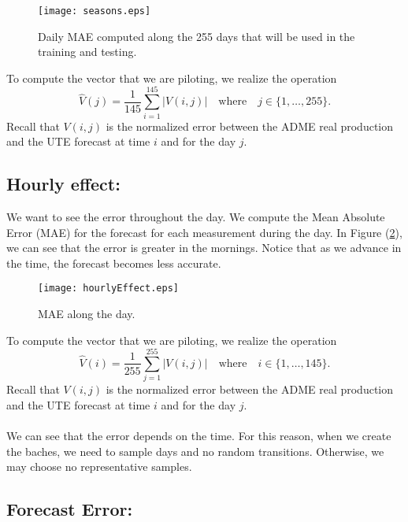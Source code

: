 \documentclass[12pt]{article}
\theoremstyle{definition}
\theoremstyle{remark}
\begin{document}
\begin{figure}[ht!]
\centering
{\texttt{[image: seasons.eps]}}
\caption{Daily MAE computed along the 255 days that will be used in the training and testing.}\label{plot1}
\end{figure}
To compute the vector that we are piloting, we realize the operation
\begin{equation*}
\hat{V}(j) =\frac{1}{145} \sum_{i=1}^{145}|V(i,j)|\quad\text{where}\quad j\in\{1,\dots,255\}.
\end{equation*}
Recall that $V(i,j)$ is the normalized error between the ADME real production and the UTE forecast at time $i$ and for the day $j$.


\pagebreak 

\subsection*{Hourly effect:}

We want to see the error throughout the day. We compute the Mean Absolute Error (MAE) for the forecast for each measurement during the day. In Figure (\ref{plot2}), we can see that the error is greater in the mornings. Notice that as we advance in the time, the forecast becomes less accurate.

\begin{figure}[ht!]
\centering
{\texttt{[image: hourlyEffect.eps]}}
\caption{MAE along the day.}\label{plot2}
\end{figure}

To compute the vector that we are piloting, we realize the operation
\begin{equation*}
\hat{V}(i) =\frac{1}{255} \sum_{j=1}^{255}|V(i,j)|\quad\text{where}\quad i\in\{1,\dots,145\}.
\end{equation*}
Recall that $V(i,j)$ is the normalized error between the ADME real production and the UTE forecast at time $i$ and for the day $j$.\\
\quad\\
{\color{red} We can see that the error depends on the time. For this reason, when we create the baches, we need to sample days and no random transitions. Otherwise, we may choose no representative samples.}

\pagebreak 

\subsection*{Forecast Error:}
\end{document}
